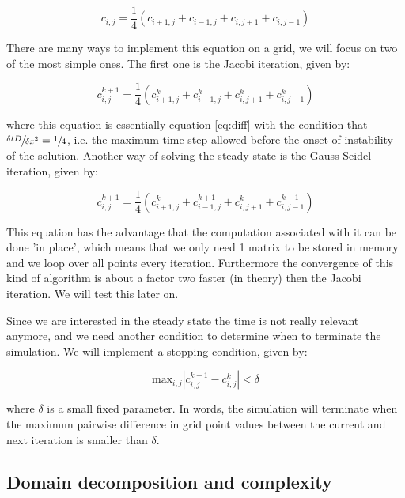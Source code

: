 \documentclass[11pt,a4paper,onecolumn]{article}
\begin{document}
\begin{equation}
  c_{i,j} = \frac{1}{4}(c_{i+1,j} + c_{i-1,j} + c_{i,j+1} + c_{i,j-1})
\end{equation}

There are many ways to implement this equation on a grid, we will focus on two of the most simple ones. The first one is the Jacobi iteration, given by:

\begin{equation}
  \label{eq:jacobi}
   c_{i,j}^{k+1} = \frac{1}{4}(c_{i+1,j}^k + c_{i-1,j}^k + c_{i,j+1}^k + c_{i,j-1}^k)
\end{equation}

where this equation is essentially equation \ref{eq:diff} with the condition that $\sfrac{\delta tD}{\delta x^2} = \sfrac{1}{4}$, i.e. the maximum time step allowed before the onset of instability of the solution. Another way of solving the steady state is the Gauss-Seidel iteration, given by:

\begin{equation}
  \label{eq:gauss}
   c_{i,j}^{k+1} = \frac{1}{4}(c_{i+1,j}^k + c_{i-1,j}^{k+1} + c_{i,j+1}^k + c_{i,j-1}^{k+1})  
\end{equation}

This equation has the advantage that the computation associated with it can be done 'in place', which means that we only need 1 matrix to be stored in memory and we loop over all points every iteration. Furthermore the convergence of this kind of algorithm is about a factor two faster (in theory) then the Jacobi iteration. We will test this later on.

Since we are interested in the steady state the time is not really relevant anymore, and we need another condition to determine when to terminate the simulation. We will implement a stopping condition, given by:

\begin{equation}
  \label{eq:stop}
  \text{max}_{i,j} | c_{i,j}^{k+1} - c_{i,j}^k | < \delta 
\end{equation}

where $\delta$ is a small fixed parameter. In words, the simulation will terminate when the maximum pairwise difference in grid point values between the current and next iteration is smaller than $\delta$. 

\subsection{Domain decomposition and complexity}
\end{document}
